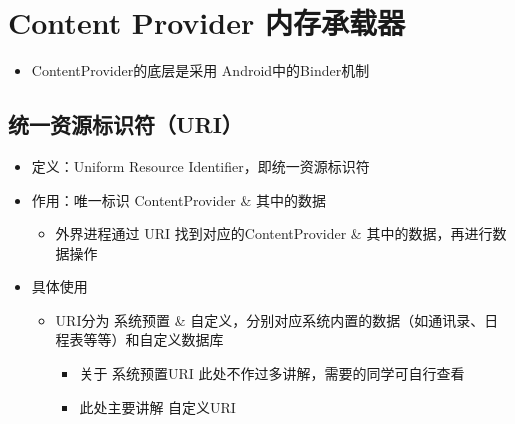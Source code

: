 \documentclass[9pt, b5paaper]{book}
\begin{document}
\chapter{Content Provider 内存承载器}
\label{sec-5}
\begin{itemize}
\item ContentProvider的底层是采用 Android中的Binder机制
\end{itemize}
\section{统一资源标识符（URI）}
\label{sec-5-1}
\begin{itemize}
\item 定义：Uniform Resource Identifier，即统一资源标识符
\item 作用：唯一标识 ContentProvider \& 其中的数据
\begin{itemize}
\item 外界进程通过 URI 找到对应的ContentProvider \& 其中的数据，再进行数据操作
\end{itemize}
\item 具体使用
\begin{itemize}
\item URI分为 系统预置 \& 自定义，分别对应系统内置的数据（如通讯录、日程表等等）和自定义数据库
\begin{itemize}
\item 关于 系统预置URI 此处不作过多讲解，需要的同学可自行查看
\item 此处主要讲解 自定义URI
\end{itemize}
\end{itemize}
\end{itemize}
\end{document}
